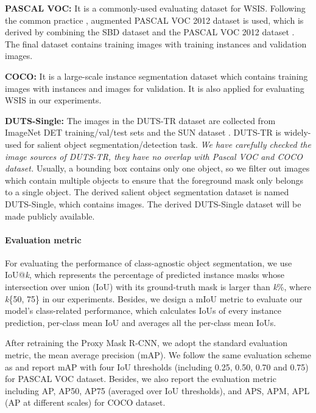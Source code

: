 \documentclass[final]{cvpr}
\begin{document}
\textbf{PASCAL VOC:} It is a commonly-used evaluating dataset for WSIS. Following the common practice \cite{khoreva2017simple}, augmented PASCAL VOC 2012 dataset is used, which is derived by combining the SBD dataset \cite{hariharan2011semantic} and the PASCAL VOC 2012 dataset \cite{everingham2015pascal}. The final dataset contains  training images with  training instances and  validation images.

\textbf{COCO:} It is a large-scale instance segmentation dataset which contains  training images with  instances and  images for validation. It is also applied for evaluating WSIS in our experiments.

\textbf{DUTS-Single:} The images in the DUTS-TR dataset \cite{wang2017learning} are collected from ImageNet DET \cite{deng2009imagenet} training/val/test sets and the SUN dataset \cite{5539970}. DUTS-TR is widely-used for salient object segmentation/detection task. \textit{We have carefully checked the image sources of DUTS-TR, they have no overlap with Pascal VOC and COCO dataset.} Usually, a bounding box contains only one object, so we filter out images which contain multiple objects to ensure that the foreground mask only belongs to a single object. The derived salient object segmentation dataset is named  DUTS-Single, which contains  images. The derived DUTS-Single dataset will be made publicly available.



\vspace{-3mm}
\paragraph{Evaluation metric}

For evaluating the performance of class-agnostic object segmentation, we use IoU@\emph{k}, which represents the percentage of predicted instance masks whose intersection over union (IoU) with its ground-truth mask is larger than \emph{k}\%, where \emph{k}\{50, 75\} in our experiments. Besides, we design a mIoU metric to evaluate our model's class-related performance, which calculates IoUs of every instance prediction, per-class mean IoU and averages all the per-class mean IoUs.





After retraining the Proxy Mask R-CNN, we adopt the standard evaluation metric, the mean average precision (mAP). We follow the same evaluation scheme as \cite{hsu2019weakly} and report mAP with four IoU thresholds (including 0.25, 0.50, 0.70 and 0.75) for PASCAL VOC dataset. Besides, we also report the evaluation metric including AP, AP50, AP75 (averaged over IoU thresholds), and APS, APM, APL (AP at different scales) for COCO dataset.
\end{document}
